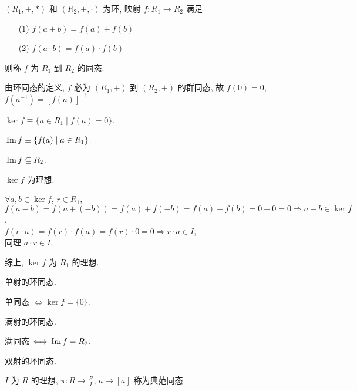 \documentclass{note}
\begin{document}
\begin{df}[环同态]
    $(R_1,+,*)$ 和 $(R_2,+,\cdot)$ 为环, 映射 $f:R_1\rightarrow R_2$ 满足
    \begin{itemize}
        \item[(1)] $f(a+b)=f(a)+f(b)$
        \item[(2)] $f(a\cdot b)=f(a)\cdot f(b)$
    \end{itemize}
    则称 $f$ 为 $R_1$ 到 $R_2$ 的同态.
\end{df}

由环同态的定义, $f$ 必为 $(R_1,+)$ 到 $(R_2,+)$ 的群同态, 故 $f(0)=0$, $f(a^{-1})=[f(a)]^{-1}$.

\begin{df}[核]
    $\ker f\equiv\{a\in R_1\mid f(a)=0\}$.
\end{df}

\begin{df}[像]
    $\,\mathrm{Im}\, f\equiv\{f(a)\mid a\in R_1\}$.
\end{df}

$\,\mathrm{Im}\, f\subseteq R_2$.

\begin{thm}
    $\ker f$ 为理想.
\end{thm}
\begin{pf}
    $\forall a,b\in\ker f$, $r\in R_1$, $f(a-b)=f(a+(-b))=f(a)+f(-b)=f(a)-f(b)=0-0=0\Longrightarrow a-b\in\ker f$.\\
    $f(r\cdot a)=f(r)\cdot f(a)=f(r)\cdot 0=0\Longrightarrow r\cdot a\in I$,\\
    同理 $a\cdot r\in I$.

    综上, $\ker f$ 为 $R_1$ 的理想.
\end{pf}

\begin{df}[单同态]
    单射的环同态.
\end{df}

单同态 $\Longleftrightarrow\ker f=\{0\}$.

\begin{df}[满同态]
    满射的环同态.
\end{df}

满同态 $\Longleftrightarrow\,\mathrm{Im}\, f=R_2$.

\begin{df}[同构]
    双射的环同态.
\end{df}

\begin{df}[典范同态]
    $I$ 为 $R$ 的理想, $\pi:R\rightarrow\frac{R}{I}$, $a\mapsto[a]$ 称为典范同态.
\end{df}
\end{document}
